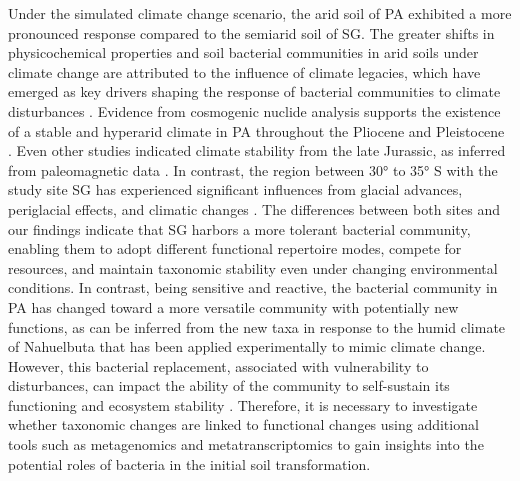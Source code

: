 Under the simulated climate change scenario, the arid soil of PA exhibited a more pronounced response compared to the semiarid soil of SG. The greater shifts in physicochemical properties and soil bacterial communities in arid soils under climate change are attributed to the influence of climate legacies, which have emerged as key drivers shaping the response of bacterial communities to climate disturbances \citep{DelgadoBaquerizo2017a, DelgadoBaquerizo2018}. Evidence from cosmogenic nuclide analysis supports the existence of a stable and hyperarid climate in PA throughout the Pliocene and Pleistocene \citep{Placzek2009}. Even other studies indicated climate stability from the late Jurassic, as inferred from paleomagnetic data \citep{Hartley2005}. In contrast, the region between \ang{30} to \ang{35} S with the study site SG has experienced significant influences from glacial advances, periglacial effects, and climatic changes \citep{Arroyo2012}. The differences between both sites and our findings indicate that SG harbors a more tolerant bacterial community, enabling them to adopt different functional repertoire modes, compete for resources, and maintain taxonomic stability even under changing environmental conditions. In contrast, being sensitive and reactive, the bacterial community in PA has changed toward a more versatile community with potentially new functions, as can be inferred from the new taxa in response to the humid climate of Nahuelbuta that has been applied experimentally to mimic climate change. However, this bacterial replacement, associated with vulnerability to disturbances, can impact the ability of the community to self-sustain its functioning and ecosystem stability \citep{ChenLeung2021}. Therefore, it is necessary to investigate whether taxonomic changes are linked to functional changes using additional tools such as metagenomics and metatranscriptomics to gain insights into the potential roles of bacteria in the initial soil transformation.

